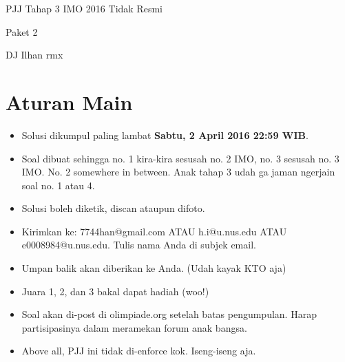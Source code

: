 \documentclass{article}
\begin{document}
	\begin{center}
		{\huge PJJ Tahap 3 IMO 2016 Tidak Resmi}
		
		\vspace{1em}
		
		{\Large Paket 2}
		
		\vspace{1em}
		
		DJ Ilhan rmx
	\end{center}
	\section{Aturan Main}
	\begin{itemize}
		\item Solusi dikumpul paling lambat \textbf{Sabtu, 2 April 2016 22:59 WIB}.
		\item Soal dibuat sehingga no. 1 kira-kira sesusah no. 2 IMO, no. 3 sesusah no. 3 IMO. No. 2 somewhere in between. Anak tahap 3 udah ga jaman ngerjain soal no. 1 atau 4.
		\item Solusi boleh diketik, discan ataupun difoto.
		\item Kirimkan ke: 7744han@gmail.com ATAU h.i@u.nus.edu ATAU e0008984@u.nus.edu. Tulis nama Anda di subjek email.
		\item Umpan balik akan diberikan ke Anda. (Udah kayak KTO aja)
		\item Juara 1, 2, dan 3 bakal dapat hadiah (woo!)
		\item Soal akan di-post di olimpiade.org setelah batas pengumpulan. Harap partisipasinya dalam meramekan forum anak bangsa.
		\item Above all, PJJ ini tidak di-enforce kok. Iseng-iseng aja.
	\end{itemize}
\end{document}
